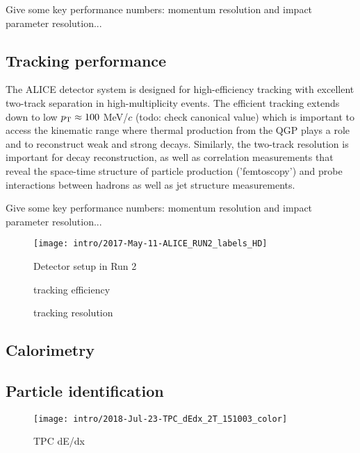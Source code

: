 Give some key performance numbers: momentum resolution and impact parameter resolution...

\subsection{Tracking performance}

The ALICE detector system is designed for high-efficiency tracking with excellent two-track separation in high-multiplicity events. The efficient tracking extends down to low $p_{\rm T} \approx 100$ MeV/$c$ (todo: check canonical value) which is important to access the kinematic range where thermal production from the QGP plays a role and to reconstruct weak and strong decays.
Similarly, the two-track resolution is important for decay reconstruction, as well as correlation measurements that reveal the space-time structure of particle production ('femtoscopy') and probe interactions between hadrons as well as jet structure measurements.

Give some key performance numbers: momentum resolution and impact parameter resolution...

\begin{figure}
\centering
\texttt{[image: intro/2017-May-11-ALICE\_RUN2\_labels\_HD]}
\caption{Detector setup in Run 2}
\label{fig:alice_run2}
\end{figure}

\begin{figure}
\centering
\caption{tracking efficiency}
\label{fig:trk_eff}
\end{figure}

\begin{figure}
\centering
\caption{tracking \pt resolution}
\label{fig:trk_res}
\end{figure}

\subsection{Calorimetry}

\subsection{Particle identification}

\begin{figure}
\centering
\texttt{[image: intro/2018-Jul-23-TPC\_dEdx\_2T\_151003\_color]}
\caption{TPC dE/dx}
\label{fig:tpc_dedx}
\end{figure}

